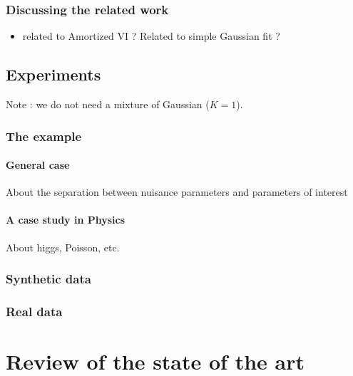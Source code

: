 \subsection{Discussing the related work} 

\begin{itemize}
    \item related to Amortized VI ? Related to simple Gaussian fit ?
\end{itemize}


\section{Experiments}

Note : we do not need a mixture of Gaussian ($K=1$).


\subsection{The example} 
\subsubsection{General case} 

About the separation between nuisance parameters and parameters of interest

\subsubsection{A case study in Physics} 

About higgs, Poisson, etc.


\subsection{Synthetic data}

\subsection{Real data}







\chapter{Review of the state of the art}

